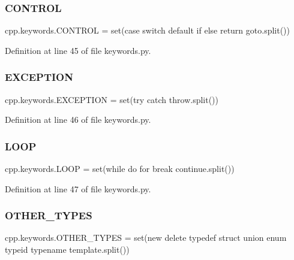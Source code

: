 \subsubsection{\texorpdfstring{C\+O\+N\+T\+R\+OL}{CONTROL}}
{\footnotesize\ttfamily cpp.\+keywords.\+C\+O\+N\+T\+R\+OL = set(\textquotesingle{}case switch default if else return goto\textquotesingle{}.split())}



Definition at line 45 of file keywords.\+py.

\mbox{\label{namespacecpp_1_1keywords_a2665fb8a25a4dae03fa5d3dc975c537c}} 
\subsubsection{\texorpdfstring{E\+X\+C\+E\+P\+T\+I\+ON}{EXCEPTION}}
{\footnotesize\ttfamily cpp.\+keywords.\+E\+X\+C\+E\+P\+T\+I\+ON = set(\textquotesingle{}try catch throw\textquotesingle{}.split())}



Definition at line 46 of file keywords.\+py.

\mbox{\label{namespacecpp_1_1keywords_af0164c05398a2291487b76414102d555}} 
\subsubsection{\texorpdfstring{L\+O\+OP}{LOOP}}
{\footnotesize\ttfamily cpp.\+keywords.\+L\+O\+OP = set(\textquotesingle{}while do for break continue\textquotesingle{}.split())}



Definition at line 47 of file keywords.\+py.

\mbox{\label{namespacecpp_1_1keywords_aa86a5e35a3ace14022a5ca1b91baf207}} 
\subsubsection{\texorpdfstring{O\+T\+H\+E\+R\+\_\+\+T\+Y\+P\+ES}{OTHER\_TYPES}}
{\footnotesize\ttfamily cpp.\+keywords.\+O\+T\+H\+E\+R\+\_\+\+T\+Y\+P\+ES = set(\textquotesingle{}new delete typedef struct union enum typeid typename template\textquotesingle{}.split())}



